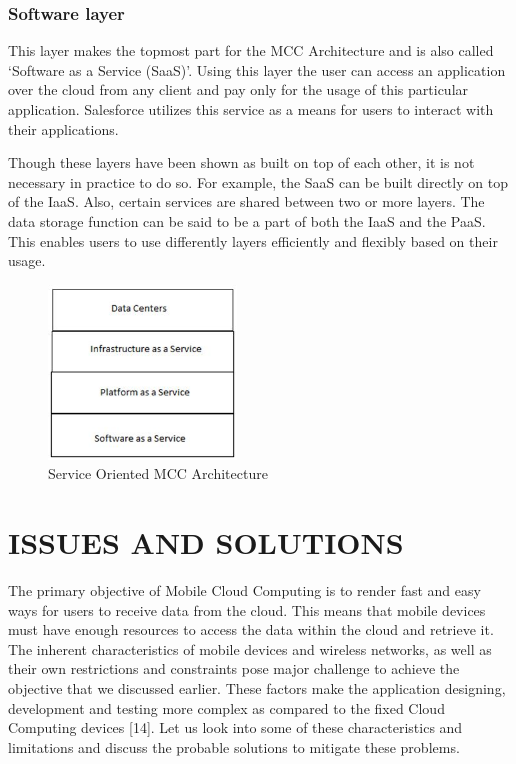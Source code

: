 \documentclass[10pt, conference, compsocconf]{IEEEtran}
\begin{document}
\subsubsection{Software layer}
This layer makes the topmost part for the MCC Architecture and is also called `Software as a Service (SaaS)'. Using this layer the user can access an application over the cloud from any client and pay only for the usage of this particular application. Salesforce utilizes this service as a means for users to interact with their applications.


Though these layers have been shown as built on top of each other, it is not necessary in practice to do so. For example, the SaaS can be built directly on top of the IaaS. Also, certain services are shared between two or more layers. The data storage function can be said to be a part of both the IaaS and the PaaS. This enables users to use differently layers efficiently and flexibly based on their usage.

\begin{figure}[h!]
\begin{center}
    \includegraphics[scale=1,width=50mm]{fig3v2}
\end{center}
\caption{Service Oriented MCC Architecture}
\end{figure}



\section{ISSUES AND SOLUTIONS}
The primary objective of Mobile Cloud Computing is to render fast and easy ways for users to receive data from the cloud. This means that mobile devices must have enough resources to access the data within the cloud and retrieve it. The inherent characteristics of mobile devices and wireless networks, as well as their own restrictions and constraints pose major challenge to achieve the objective that we discussed earlier. These factors make the application designing, development and testing more complex as compared to the fixed Cloud Computing devices [14]. Let us look into some of these characteristics and limitations and discuss the probable solutions to mitigate these problems.
\end{document}
